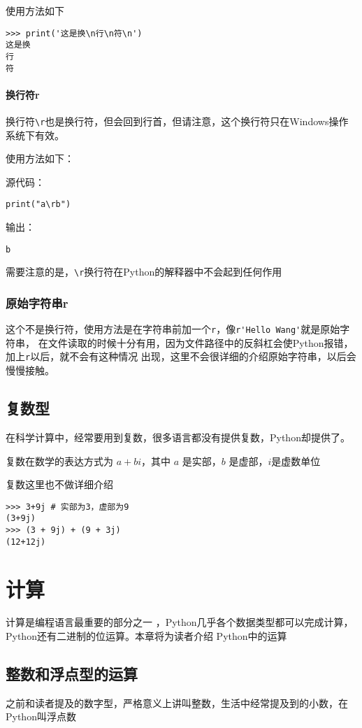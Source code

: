 \documentclass{book}
\begin{document}
使用方法如下


\begin{verbatim}
>>> print('这是换\n行\n符\n')
这是换
行
符
\end{verbatim}

\subsubsection{换行符r}

\indent 换行符\verb|\r|也是换行符，但会回到行首，但请注意，这个换行符只在Windows操作系统下有效。


使用方法如下：


源代码：

\begin{verbatim}
print("a\rb")
\end{verbatim}

输出：
\begin{verbatim}
b
\end{verbatim}

需要注意的是，\verb|\r|换行符在Python的解释器中不会起到任何作用

\subsection{原始字符串r}
\indent 这个不是换行符，使用方法是在字符串前加一个\verb|r|，像\verb|r'Hello Wang'|就是原始字符串，
在文件读取的时候十分有用，因为文件路径中的反斜杠会使Python报错，加上\verb|r|以后，就不会有这种情况
出现，这里不会很详细的介绍原始字符串，以后会慢慢接触。
\section{复数型}
\indent 在科学计算中，经常要用到复数，很多语言都没有提供复数，Python却提供了。

复数在数学的表达方式为 $a + bi$，其中 $a$ 是实部，$b$ 是虚部，$i$是虚数单位


复数这里也不做详细介绍


\begin{verbatim}
>>> 3+9j # 实部为3，虚部为9
(3+9j)
>>> (3 + 9j) + (9 + 3j)
(12+12j)
\end{verbatim}
\chapter{计算}
\indent 计算是编程语言最重要的部分之一
，Python几乎各个数据类型都可以完成计算，
Python还有二进制的位运算。本章将为读者介绍
Python中的运算
\section{整数和浮点型的运算}
\indent 之前和读者提及的数字型，严格意义上讲叫整数，生活中经常提及到的小数，在Python叫浮点数
\end{document}
